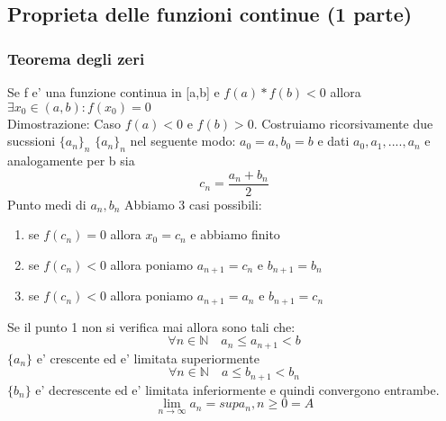 \documentclass{article}
\begin{document}
        \subsection{Proprieta delle funzioni continue (1 parte)}
        \begin{flushleft}
            \subsubsection{Teorema degli zeri}
            \begin{flushleft}
                Se f e' una funzione continua in [a,b] e $f(a)*f(b)<0$ allora $\exists x_0 \in (a,b):f(x_0)=0$\\
                Dimostrazione: Caso $f(a)<0$ e $f(b)>0$. Costruiamo ricorsivamente due sucssioni $\{a_n\}_n$ $\{a_n\}_n$
                nel seguente modo: $a_0=a,b_0=b$ e dati $a_0,a_1,....,a_n$ e analogamente per b sia
                \begin{equation}
                    c_n=\frac{a_n+b_n}{2}
                \end{equation}
                Punto medi di $a_n,b_n$ Abbiamo 3 casi possibili:
                \begin{enumerate}
                    \item se $f(c_n)=0$ allora $x_0=c_n$ e abbiamo finito
                    \item se $f(c_n)<0$ allora poniamo $a_{n+1}=c_n$ e $b_{n+1}=b_n$
                    \item se $f(c_n)<0$ allora poniamo $a_{n+1}=a_n$ e $b_{n+1}=c_n$
                \end{enumerate}
                Se il punto 1 non si verifica mai allora sono tali che:
                \begin{equation}
                    \forall n \in \mathbb{N} \quad a_n\leq a_{n+1}<b
                \end{equation}
                $\{a_n\}$ e' crescente ed e' limitata superiormente
                \begin{equation}
                    \forall n \in \mathbb{N} \quad a\leq b_{n+1}<b_n
                \end{equation}
                $\{b_n\}$ e' decrescente ed e' limitata inferiormente e quindi convergono entrambe.
                \begin{equation}
                    \lim_{n\to \infty} a_n=sup{a_n,n\geq 0}=A
                \end{equation}
                \begin{equation}

\end{equation}
\end{flushleft}
\end{flushleft}
\end{document}
